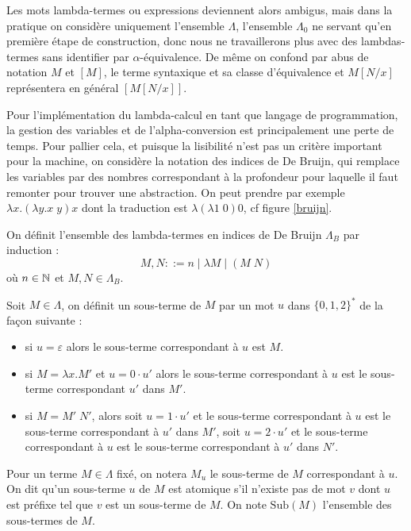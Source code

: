 \begin{rmk}
    Les mots \og lambda-termes\fg{} ou \og expressions\fg{} deviennent alors ambigus, mais dans la pratique on considère uniquement l'ensemble $\Lambda$, l'ensemble $\Lambda_0$ ne servant qu'en première étape de construction, donc nous ne travaillerons plus avec des lambdas-termes sans identifier par $\alpha$-équivalence. De même on confond par abus de notation $M$ et $[M]$, le terme syntaxique et sa classe d'équivalence et $M[N/x]$ représentera en général $[M[N/x]]$.
\end{rmk}

Pour l'implémentation du lambda-calcul en tant que langage de programmation, la gestion des variables et de l'alpha-conversion est principalement une perte de temps. Pour pallier cela, et puisque la lisibilité n'est pas un critère important pour la machine, on considère la notation des indices de De Bruijn, qui remplace les variables par des nombres correspondant à la profondeur pour laquelle il faut remonter pour trouver une abstraction. On peut prendre par exemple $\lambda x.(\lambda y.x\;y)x$ dont la traduction est $\lambda (\lambda 1\;0)0$, cf figure \ref{bruijn}.

\begin{defi}
    On définit l'ensemble des lambda-termes en indices de De Bruijn $\Lambda_B$ par induction : $$M,N ::= n \mid \lambda M\mid (M\;N)$$ où $n\in\mathbb{N}$ et $M,N\in\Lambda_B$.
\end{defi}

\label{bruijn}

\begin{defi}
    Soit $M\in\Lambda$, on définit un sous-terme de $M$ par un mot $u$ dans $\{0,1,2\}^*$ de la façon suivante :
    \begin{itemize}[label=$\bullet$]
        \item si $u=\varepsilon$ alors le sous-terme correspondant à $u$ est $M$.
        \item si $M = \lambda x.M'$ et $u = 0\cdot u'$ alors le sous-terme correspondant à $u$ est le sous-terme correspondant $u'$ dans $M'$.
        \item si $M = M'\;N'$, alors soit $u = 1\cdot u'$ et le sous-terme correspondant à $u$ est le sous-terme correspondant à $u'$ dans $M'$, soit $u = 2\cdot u'$ et le sous-terme correspondant à $u$ est le sous-terme correspondant à $u'$ dans $N'$.
    \end{itemize}

    Pour un terme $M\in\Lambda$ fixé, on notera $M_u$ le sous-terme de $M$ correspondant à $u$. On dit qu'un sous-terme $u$ de $M$ est atomique s'il n'existe pas de mot $v$ dont $u$ est préfixe tel que $v$ est un sous-terme de $M$. On note $\mathrm{Sub}(M)$ l'ensemble des sous-termes de $M$.
\end{defi}

